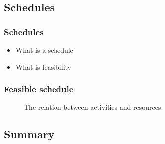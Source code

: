 \documentclass{beamer}
\theoremstyle{definition}
\newcommand{\inputtikz}[1]{}
\begin{document}
\subsection{Schedules}
\begin{frame}
	\frametitle{Schedules}
	\begin{itemize}
		\item What is a schedule
		\item What is feasibility
	\end{itemize}
\end{frame}

\begin{frame}
	\frametitle{Feasible schedule}
	\vspace{-1em}
	\begin{figure}[ht]
		\makebox[\textwidth][c]{\resizebox{.38\paperwidth}{!}{
			\inputtikz{schedule_feasible_profile}
		}}
		\vspace{-1.2em}
		\caption{The relation between activities and resources}
		\label{fig:activity_graph}
	\end{figure}
\end{frame}

\subsection{Summary}
\end{document}
